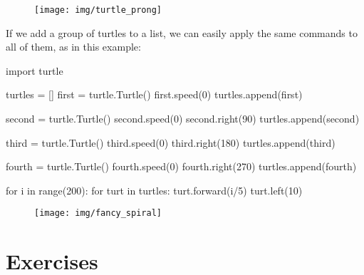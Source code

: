 \documentclass[11pt]{cselabheader}
\begin{document}
\begin{figure}[h]
  \centering
  \texttt{[image: img/turtle\_prong]}
\end{figure}

If we add a group of turtles to a list, we can easily apply the same commands to all of them, as in this example:

\begin{python3code}
import turtle

turtles = []
first = turtle.Turtle()
first.speed(0)
turtles.append(first)

second = turtle.Turtle()
second.speed(0)
second.right(90)
turtles.append(second)

third = turtle.Turtle()
third.speed(0)
third.right(180)
turtles.append(third)

fourth = turtle.Turtle()
fourth.speed(0)
fourth.right(270)
turtles.append(fourth)

for i in range(200):
    for turt in turtles:
        turt.forward(i/5)
        turt.left(10)
\end{python3code}

\begin{figure}[h]
  \centering
  \texttt{[image: img/fancy\_spiral]}
\end{figure}




\section{Exercises}\label{exercises}
\end{document}
